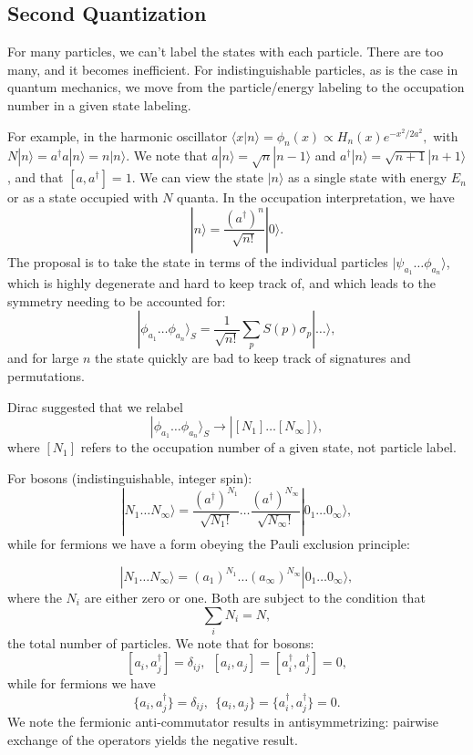 \documentclass[fontsize=12pt]{scrartcl}
\newcommand{\la}{\langle}
\newcommand{\ra}{\rangle}
\begin{document}
\subsection{Second Quantization}

For many particles, we can't label the states with each particle. There are too many, and it becomes inefficient. For indistinguishable particles, as is the case in quantum mechanics, we move from the particle/energy labeling to the occupation number in a given state labeling.

For example, in the harmonic oscillator $\la x|n\ra = \phi_n(x)\propto H_n(x)e^{-x^2/2a^2},$ with $N|n\ra = a^\dagger a|n\ra = n|n\ra$. We note that $a|n\ra = \sqrt{n}|n-1\ra$ and $a^\dagger|n\ra = \sqrt{n+1}|n+1\ra$, and that $[a, a^\dagger]=1$. We can view the state $|n\ra$ as a single state with energy $E_n$ or as a state occupied with $N$ quanta. In the occupation interpretation, we have $$|n\ra = \frac{(a^\dagger)^n}{\sqrt{n!}}|0\ra.$$ The proposal is to take the state in terms of the individual particles $|\psi_{a_1}\dots\phi_{a_n}\ra$, which is highly degenerate and hard to keep track of, and which leads to the symmetry needing to be accounted for: $$|\phi_{a_1}\dots\phi_{a_n}\ra_S = \frac{1}{\sqrt{n!}}\sum_p S(p)\sigma_p|\dots\ra,$$ and for large $n$ the state quickly are bad to keep track of signatures and permutations.

Dirac suggested that we relabel $$|\phi_{a_1}\dots \phi_{a_n}\ra_S \to |[N_1]\dots[N_\infty]\ra,$$ where $[N_1]$ refers to the occupation number of a given state, not particle label.

For bosons (indistinguishable, integer spin): $$|N_1\dots N_\infty\ra = \frac{(a^\dagger)^{N_1}}{\sqrt{N_1!}}\dots \frac{(a^\dagger)^{N_\infty}}{\sqrt{N_\infty!}}|0_1\dots 0_\infty\ra,$$ while for fermions we have a form obeying the Pauli exclusion principle:

$$ |N_1\dots N_\infty\ra = (a_1)^{N_1}\dots (a_\infty)^{N_\infty}|0_1\dots 0_\infty\ra,$$ where the $N_i$ are either zero or one. Both are subject to the condition that $$\sum_i N_i = N,$$ the total number of particles. We note that for bosons: $$[a_i, a^\dagger_j] = \delta_{ij}, \ \ [a_i,a_j]=[a^\dagger_i, a^\dagger_j]=0,$$ while for fermions we have $$\{a_i, a^\dagger_j\}= \delta_{ij}, \ \ \{a_i,a_j\}=\{a^\dagger_i, a^\dagger_j\}=0.$$ We note the fermionic anti-commutator results in antisymmetrizing: pairwise exchange of the operators yields the negative result. 
\end{document}
